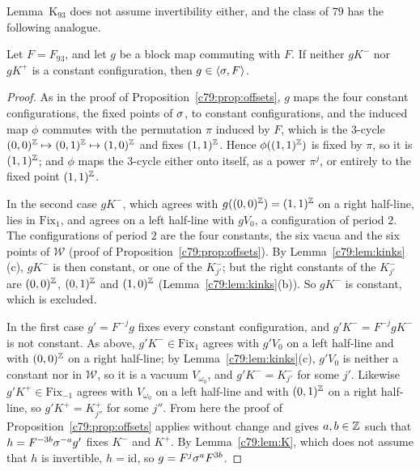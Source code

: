 Lemma~K$_{93}$ does not assume invertibility either, and the class of $79$ has the following analogue.

\begin{corollary}\label{cor:End93}
Let $F=F_{93}$, and let $g$ be a block map commuting with $F$. If neither $gK^-$ nor $gK^+$ is a constant configuration, then $g\in\langle\sigma,F\rangle$.
\end{corollary}

\begin{proof}
As in the proof of Proposition~\ref{c79:prop:offsets}, $g$ maps the four constant configurations, the fixed points of $\sigma$, to constant configurations, and the induced map $\phi$ commutes with the permutation $\pi$ induced by $F$, which is the $3$-cycle $(0,0)^{\mathbb{Z}}\mapsto(0,1)^{\mathbb{Z}}\mapsto(1,0)^{\mathbb{Z}}$ and fixes $(1,1)^{\mathbb{Z}}$. Hence $\phi((1,1)^{\mathbb{Z}})$ is fixed by $\pi$, so it is $(1,1)^{\mathbb{Z}}$; and $\phi$ maps the $3$-cycle either onto itself, as a power $\pi^j$, or entirely to the fixed point $(1,1)^{\mathbb{Z}}$.

In the second case $gK^-$, which agrees with $g((0,0)^{\mathbb{Z}})=(1,1)^{\mathbb{Z}}$ on a right half-line, lies in $\mathrm{Fix}_1$, and agrees on a left half-line with $gV_0$, a configuration of period $2$. The configurations of period $2$ are the four constants, the six vacua and the six points of $\mathcal W$ (proof of Proposition~\ref{c79:prop:offsets}). By Lemma~\ref{c79:lem:kinks}(c), $gK^-$ is then constant, or one of the $K^-_{j'}$; but the right constants of the $K^-_{j'}$ are $(0,0)^{\mathbb{Z}}$, $(0,1)^{\mathbb{Z}}$ and $(1,0)^{\mathbb{Z}}$ (Lemma~\ref{c79:lem:kinks}(b)). So $gK^-$ is constant, which is excluded.

In the first case $g'=F^{-j}g$ fixes every constant configuration, and $g'K^-=F^{-j}gK^-$ is not constant. As above, $g'K^-\in\mathrm{Fix}_1$ agrees with $g'V_0$ on a left half-line and with $(0,0)^{\mathbb{Z}}$ on a right half-line; by Lemma~\ref{c79:lem:kinks}(c), $g'V_0$ is neither a constant nor in $\mathcal W$, so it is a vacuum $V_{\omega_0}$, and $g'K^-=K^-_{j'}$ for some $j'$. Likewise $g'K^+\in\mathrm{Fix}_{-1}$ agrees with $V_{\omega_0}$ on a left half-line and with $(0,1)^{\mathbb{Z}}$ on a right half-line, so $g'K^+=K^+_{j''}$ for some $j''$. From here the proof of Proposition~\ref{c79:prop:offsets} applies without change and gives $a,b\in\mathbb{Z}$ such that $h=F^{-3b}\sigma^{-a}g'$ fixes $K^-$ and $K^+$. By Lemma~\ref{c79:lem:K}, which does not assume that $h$ is invertible, $h=\mathrm{id}$, so $g=F^j\sigma^aF^{3b}$.
\end{proof}

